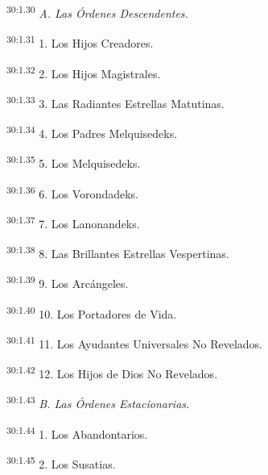 \par
\textsuperscript{30:1.30} \textit{A. Las Órdenes Descendentes.}

\par
\textsuperscript{30:1.31} 1. Los Hijos Creadores.

\par
\textsuperscript{30:1.32} 2. Los Hijos Magistrales.

\par
\textsuperscript{30:1.33} 3. Las Radiantes Estrellas Matutinas.

\par
\textsuperscript{30:1.34} 4. Los Padres Melquisedeks.

\par
\textsuperscript{30:1.35} 5. Los Melquisedeks.

\par
\textsuperscript{30:1.36} 6. Los Vorondadeks.

\par
\textsuperscript{30:1.37} 7. Los Lanonandeks.

\par
\textsuperscript{30:1.38} 8. Las Brillantes Estrellas Vespertinas.

\par
\textsuperscript{30:1.39} 9. Los Arcángeles.

\par
\textsuperscript{30:1.40} 10. Los Portadores de Vida.

\par
\textsuperscript{30:1.41} 11. Los Ayudantes Universales No Revelados.

\par
\textsuperscript{30:1.42} 12. Los Hijos de Dios No Revelados.

\par
\textsuperscript{30:1.43} \textit{B. Las Órdenes Estacionarias.}

\par
\textsuperscript{30:1.44} 1. Los Abandontarios.

\par
\textsuperscript{30:1.45} 2. Los Susatias.

